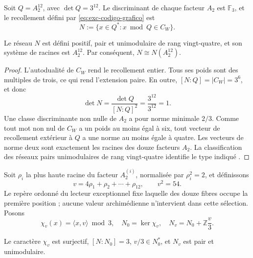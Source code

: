 Soit \(Q=A_2^{12}\), avec \(\det Q=3^{12}\). Le discriminant de chaque
facteur \(A_2\) est \(\mathbb F_3\), et le recollement défini par
\eqref{eq:exc-codigo-grafico} est
\begin{equation}
 N:=\{x\in Q^*:x\bmod Q\in C_W\}.
 \label{eq:exc-niemeier-pegado}
\end{equation}

\begin{theorem}
\label{thm:exc-niemeier}
Le réseau \(N\) est défini positif, pair et unimodulaire de rang
vingt-quatre, et son système de racines est \(A_2^{12}\). Par conséquent,
\(N\cong N(A_2^{12})\).
\end{theorem}

\begin{proof}
L'autodualité de \(C_W\) rend le recollement entier. Tous ses poids sont
des multiples de trois, ce qui rend l'extension paire. En outre,
\([N:Q]=|C_W|=3^6\), et donc
\[
 \det N=\frac{\det Q}{[N:Q]^2}
 =\frac{3^{12}}{3^{12}}=1.
\]
Une classe discriminante non nulle de \(A_2\) a pour norme minimale \(2/3\).
Comme tout mot non nul de \(C_W\) a un poids au moins égal à six, tout vecteur
de recollement extérieur à \(Q\) a une norme au moins égale à quatre. Les vecteurs de
norme deux sont exactement les racines des douze facteurs \(A_2\). La
classification des réseaux pairs unimodulaires de rang vingt-quatre
identifie le type indiqué \citep{ConwaySloane1999}.
\end{proof}

Soit \(\rho_i\) la plus haute racine du facteur \(A_2^{(i)}\), normalisée par
\(\rho_i^2=2\), et définissons
\begin{equation}
 v=4\rho_1+\rho_2+\cdots+\rho_{12},
 \qquad v^2=54.
 \label{eq:exc-vector-vecino}
\end{equation}
Le repère ordonné du lecteur exceptionnel fixe laquelle des douze fibres occupe
la première position ; aucune valeur archimédienne n'intervient dans cette sélection.
Posons
\begin{equation}
 \chi_v(x)=\langle x,v\rangle\bmod3,
 \quad N_0=\ker\chi_v,
 \quad N_v=N_0+\mathbb Z\frac v3.
 \label{eq:exc-vecino-indice-tres}
\end{equation}

\begin{lemma}
\label{lem:exc-estructura-vecino}
Le caractère \(\chi_v\) est surjectif, \([N:N_0]=3\),
\(v/3\in N_0^*\), et \(N_v\) est pair et unimodulaire.
\end{lemma}

